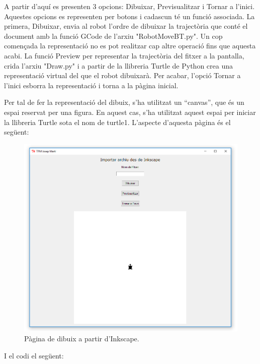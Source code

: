 A partir d’aquí es presenten 3 opcions: Dibuixar, Previsualitzar i Tornar a l’inici.  Aquestes opcions es representen per botons i cadascun té un funció associada. La primera, Dibuixar, envia al robot l’ordre de dibuixar la trajectòria que conté el document amb la funció GCode de l’arxiu "RobotMoveBT.py". Un cop començada la representació no es pot realitzar cap altre operació fins que aquesta acabi. La funció Preview per representar la trajectòria del fitxer a la pantalla, crida l’arxiu "Draw.py" i a partir de la llibreria Turtle de Python crea una representació virtual del que el robot dibuixarà. Per acabar, l’opció Tornar a l’inici esborra la representació i torna a la pàgina inicial. 

Per tal de fer la representació del dibuix, s’ha utilitzat un “canvas”, que és un espai reservat per una figura. En aquest cas, s’ha utilitzat aquest espai per iniciar la llibreria Turtle sota el nom de turtle1. L’aspecte d’aquesta pàgina és el següent:

\begin{figure}[H]
	\centering
	\includegraphics[scale=0.9]{InkPage}
	\caption{Pàgina de dibuix a partir d'Inkscape.}
	\label{fig:InkPage}
\end{figure}

I el codi el següent:

